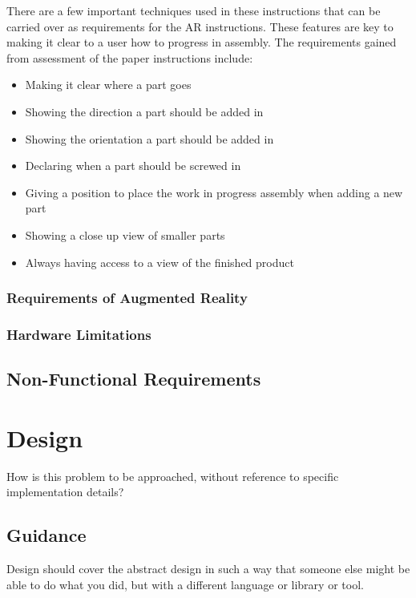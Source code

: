 \documentclass{l4proj}
\begin{document}
There are a few important techniques used in these instructions that can be carried over as requirements for the AR instructions. These features are key to making it clear to a user how to progress in assembly. The requirements gained from assessment of the paper instructions include:

\begin{itemize}
    \item Making it clear where a part goes
    \item Showing the direction a part should be added in
    \item Showing the orientation a part should be added in
    \item Declaring when a part should be screwed in
    \item Giving a position to place the work in progress assembly when adding a new part
    \item Showing a close up view of smaller parts
    \item Always having access to a view of the finished product
\end{itemize}

\subsection{Requirements of Augmented Reality}

\subsection{Hardware Limitations}



\section{Non-Functional Requirements}


\chapter{Design}



How is this problem to be approached, without reference to specific implementation details? 
\section{Guidance}
Design should cover the abstract design in such a way that someone else might be able to do what you did, but with a different language or library or tool.
\end{document}
